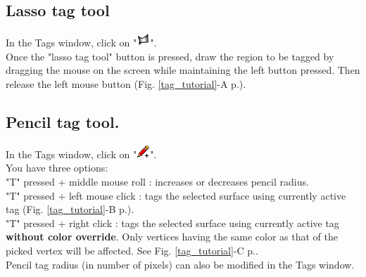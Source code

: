 \documentclass[12pt, a4paper]{book}
\begin{document}
\subsection{Lasso tag tool} \label{lasso_tag_section}
In the Tags window, click on "\includegraphics[scale=0.7]{../images/12/lasso.png}".\\
Once the "lasso tag tool" button is pressed, draw the region to be tagged by dragging the mouse on the screen while maintaining the left button pressed. Then release the left mouse button (Fig. \ref{tag_tutorial}-A p.\pageref{tag_tutorial}). 

\subsection{Pencil tag tool.}
In the Tags window, click on "\includegraphics[scale=0.7]{../images/12/pencil.png}".\\
You have three options:\\
"T" pressed + middle mouse roll : increases or decreases pencil radius.\\
"T" pressed + left mouse click : tags the selected surface using currently active tag (Fig. \ref{tag_tutorial}-B p.\pageref{tag_tutorial}).\\
"T" pressed + right click : tags the selected surface using currently active tag \textbf{without color override}. Only vertices having the same color as that of the picked vertex will be affected. See Fig. \ref{tag_tutorial}-C p.\pageref{tag_tutorial}.
\\Pencil tag radius (in number of pixels) can also be modified in the Tags window. 
\end{document}
